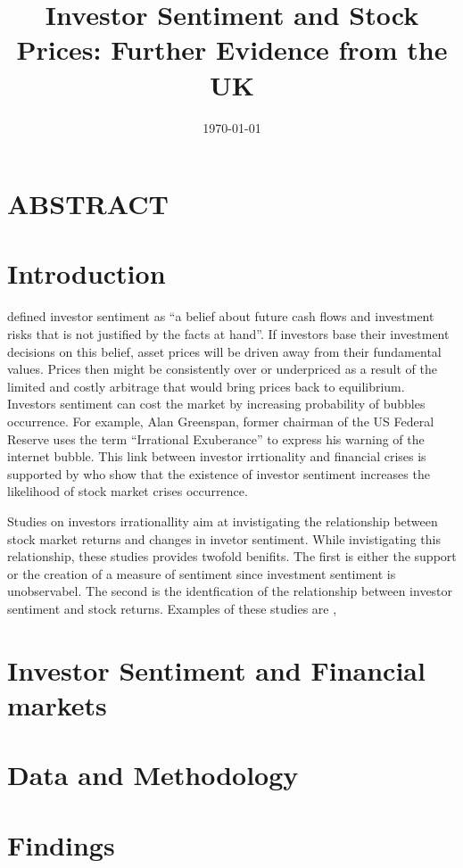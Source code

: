 \documentclass[12pt]{article}																																															%
\title{Investor Sentiment and Stock Prices: Further Evidence from the UK}																							%
\date{\today{}}																																																					%
\begin{document}
	\maketitle{}


\section{ABSTRACT} 


\section{Introduction}
\cite{Baker2007a} defined investor sentiment as “a belief about future cash flows and investment risks that is not justified by the facts at hand”. If investors base their investment decisions on this belief, asset prices will be driven away from their fundamental values. Prices then might be consistently over or underpriced as a result of the limited and costly arbitrage that would bring prices back to equilibrium. Investors sentiment can cost the market by increasing probability of bubbles occurrence. For example, Alan Greenspan, former chairman of the US Federal Reserve uses the term “Irrational Exuberance” to express his warning of the internet bubble. This link between investor irrtionality and financial crises is supported by \cite{Zouaoui2011} who show that the existence of investor sentiment increases the likelihood of stock market crises occurrence. 

\par Studies on investors irrationallity aim at invistigating the relationship between stock market returns and changes in invetor sentiment. While invistigating this relationship, these studies provides twofold benifits. The first is either the support or the creation of a measure of sentiment since investment sentiment is unobservabel. The second is the identfication of the relationship between investor sentiment and stock returns. Examples of these studies are \cite{Solt1988}, \cite{Lee1991, Abraham1993,Neal1998,Eichengreen1998,Fisher2000,Wang2003,Baker2006}

\section{Investor Sentiment and Financial markets}

\section{Data and Methodology}


\section{Findings}

\newpage



\end{document}
